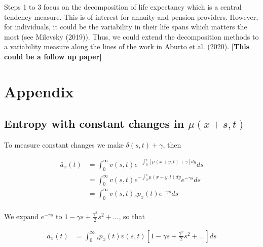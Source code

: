 \documentclass[12pt]{article}
\begin{document}
Steps 1 to 3 focus on the decomposition of life expectancy which is a
central tendency measure. This is of interest for annuity and pension
providers. However, for individuals, it could be the variability in
their life spans which matters the most (see Milevsky (2019)). Thus, we
could extend the decomposition methods to a variability measure along
the lines of the work in Aburto et al. (2020). \textbf{{[}This could be
a follow up paper{]}}





\newpage


%
%



\newpage

\appendix
\section{Appendix}



\subsection{Entropy with constant changes in $\mu(x+s,t)$}

To measure constant changes we make $\delta(s,t)+\gamma$, then

\begin{equation}\label{eq:EntropyConst1}
\begin{split}
\bar{a}_{x}(t) &= \int_0^\infty{v}(s,t) e^{-\int_{0}^{s} [\mu(x+y,t)+\gamma]dy}ds \\
&= \int_0^\infty {v}(s,t)e^{-\int_{0}^{s} \mu(x+y,t)dy} e^{-\gamma s}ds \\
&= \int_0^\infty {v}(s,t){}_sp_x(t) e^{-\gamma s}ds \\
\end{split}
\end{equation}

We expand $e^{-\gamma s}$ to $1-\gamma s+\frac{\gamma^2}{2} s^{2} +...$, so that


\begin{equation}\label{eq:EntropyConst2}
\begin{split}
\bar{a}_{x}(t) &= \int_0^\infty {}_sp_x(t) {v}(s,t)[1-\gamma s+\frac{\gamma^2}{2} s^{2} +...]ds
\end{split}
\end{equation}
\end{document}
